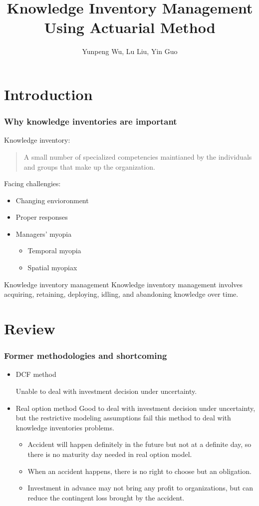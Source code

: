\documentclass[slidestop,compress,mathserif,table]{beamer}
\begin{document}
\title{Knowledge Inventory Management Using Actuarial Method}
    \author{Yunpeng Wu, Lu Liu, Yin Guo}
    \begin{frame}
      \titlepage
    \end{frame}

\section{Introduction}

\begin{frame}
  \frametitle{Why knowledge inventories are important}
Knowledge inventory:
\begin{quote}
 A small number of specialized competencies maintianed by the
 individuals and groups that make up the organization.
\end{quote}
Facing challengies:
\begin{itemize}
   \item Changing envioronment
     \item Proper responses
       \item Managers' myopia
         \begin{itemize}
         \item Temporal myopia
           \item Spatial myopiax
         \end{itemize}
\end{itemize}
\begin{block}{Knowledge inventory management}
 Knowledge inventory management involves acquiring, retaining, deploying, idling, and abandoning knowledge over time.
\end{block}
\end{frame}


\section{Review}
\begin{frame}
\frametitle{Former methodologies and shortcoming}
\begin{itemize}
\item DCF method

Unable to deal with investment decision under uncertainty.
\item Real option method
  Good to deal with investment decision under uncertainty, but the
  restrictive modeling assumptions fail this method to deal with
  knowledge inventories problems.
  \begin{itemize}
  \item  Accident will happen definitely in the future but not at a
      definite day, so there is no maturity day needed in real option
      model.
      \item When an accident happens, there is no right to choose but
        an obligation.
        \item Investment in advance may not bring any profit to
          organizations, but can reduce the contingent loss brought by the accident.
  \end{itemize}
\end{itemize}
\end{frame}
\end{document}
